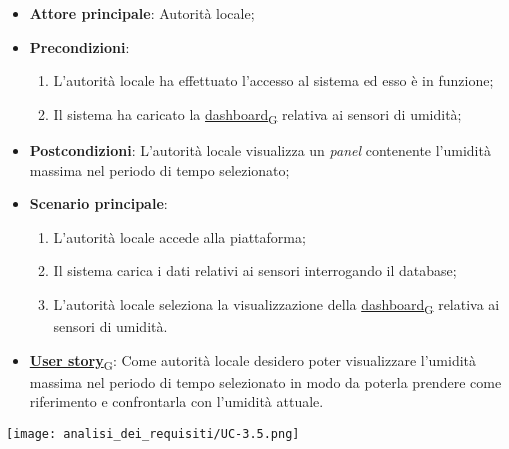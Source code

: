 \begin{itemize}
	\item \textbf{Attore principale}: Autorità locale;
	\item \textbf{Precondizioni}:
	      \begin{enumerate}
		      \item L'autorità locale ha effettuato l'accesso al sistema ed esso è in funzione;
		      \item Il sistema ha caricato la \href{https://7last.github.io/docs/rtb/documentazione-interna/glossario\#dashboard}{dashboard\textsubscript{G}} relativa ai sensori di umidità;
	      \end{enumerate}
	\item \textbf{Postcondizioni}: L'autorità locale visualizza un \textit{panel} contenente l'umidità massima nel periodo di tempo selezionato;
	\item \textbf{Scenario principale}:
	      \begin{enumerate}
		      \item L'autorità locale accede alla piattaforma;
		      \item Il sistema carica i dati relativi ai sensori interrogando il database;
		      \item L'autorità locale seleziona la visualizzazione della \href{https://7last.github.io/docs/rtb/documentazione-interna/glossario\#dashboard}{dashboard\textsubscript{G}} relativa ai sensori di umidità.
	      \end{enumerate}
	\item \href{https://7last.github.io/docs/rtb/documentazione-interna/glossario\#user-story}{\textbf{User story}\textsubscript{G}}:
	      Come autorità locale desidero poter visualizzare l'umidità massima nel periodo di tempo selezionato
	      in modo da poterla prendere come riferimento e confrontarla con l'umidità attuale.
\end{itemize}
\begin{center}
	\texttt{[image: analisi\_dei\_requisiti/UC-3.5.png]}
\end{center}

